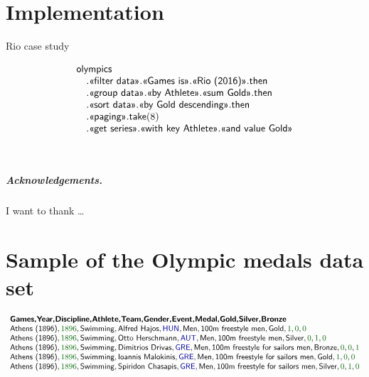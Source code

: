 \documentclass[a4paper,UKenglish]{lipics-v2016}
\theoremstyle{plain}
\theoremstyle{definition}
\newcommand{\num}[1]{\textcolor{numclr}{#1}}
\newcommand{\kvd}[1]{\textnormal{\textcolor{kvdclr}{\sffamily #1}}}
\newcommand{\ident}[1]{\textnormal{\sffamily #1}}
\newcommand{\qident}[1]{\textnormal{\sffamily \guillemotleft #1\guillemotright}}
\begin{document}
\section{Implementation}
\label{sec:impl}

Rio case study


\begin{equation*}
\begin{array}{l}
\ident{olympics}\\
\quad.\qident{filter data}.\qident{Games is}.\qident{Rio (2016)}.\ident{then}\\
\quad.\qident{group data}.\qident{by Athlete}.\qident{sum Gold}.\ident{then}\\
\quad.\qident{sort data}.\qident{by Gold descending}.\ident{then}\\
\quad.\qident{paging}.\ident{take}(8)\\
\quad.\qident{get series}.\qident{with key Athlete}.\qident{and value Gold}
\end{array}
\end{equation*}

~
\newpage

\subparagraph*{Acknowledgements.}

I want to thank \dots

\appendix
\section{Sample of the Olympic medals data set}
\label{app:olympics-csv}

{\small
\begin{equation*}
\begin{array}{l}
\textbf{\sffamily {Games},{Year},{Discipline},{Athlete},{Team},{Gender},{Event},{Medal},{Gold},{Silver},{Bronze}}\\
\ident{Athens (1896)},\num{1896},\ident{Swimming},\ident{Alfred Hajos},\kvd{HUN},\ident{Men},\ident{100m freestyle men},\ident{Gold},\num{1},\num{0},\num{0}\\
\ident{Athens (1896)},\num{1896},\ident{Swimming},\ident{Otto Herschmann},\kvd{AUT},\ident{Men},\ident{100m freestyle men},\ident{Silver},\num{0},\num{1},\num{0}\\
\ident{Athens (1896)},\num{1896},\ident{Swimming},\ident{Dimitrios Drivas},\kvd{GRE},\ident{Men},\ident{100m freestyle for sailors men},\ident{Bronze},\num{0},\num{0},\num{1}\\
\ident{Athens (1896)},\num{1896},\ident{Swimming},\ident{Ioannis Malokinis},\kvd{GRE},\ident{Men},\ident{100m freestyle for sailors men},\ident{Gold},\num{1},\num{0},\num{0}\\
\ident{Athens (1896)},\num{1896},\ident{Swimming},\ident{Spiridon Chasapis},\kvd{GRE},\ident{Men},\ident{100m freestyle for sailors men},\ident{Silver},\num{0},\num{1},\num{0}\\
\end{array}
\end{equation*} }






\end{document}
